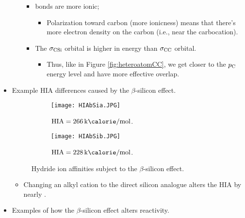 \documentclass[../notes.tex]{subfiles}
\begin{document}
\begin{itemize}
\begin{itemize}
\begin{itemize}
\begin{itemize}
            \end{itemize}
            \item {} bonds are more ionic;
            \begin{itemize}
                \item Polarization toward carbon (more ionicness) means that there's more electron density on the carbon (i.e., near the carbocation).
            \end{itemize}
            \item The $\sigma_{\ce{CSi}}$ orbital is higher in energy than $\sigma_{\ce{CC}}$ orbital.
            \begin{itemize}
                \item Thus, like in Figure \ref{fig:heteroatomCC}, we get closer to the $p_{\ce{C}}$ energy level and have more effective overlap.
            \end{itemize}
        \end{itemize}
    \end{itemize}
    \item Example HIA differences caused by the $\beta$-silicon effect.
    \begin{figure}[h!]
        \centering
        \begin{subfigure}[b]{0.25\linewidth}
            \centering
            \texttt{[image: HIAbSia.JPG]}
            \caption{$\text{HIA}=\kcal{266}$.}
            \label{fig:HIAbSia}
        \end{subfigure}
        \begin{subfigure}[b]{0.25\linewidth}
            \centering
            \texttt{[image: HIAbSib.JPG]}
            \caption{$\text{HIA}=\kcal{228}$.}
            \label{fig:HIAbSib}
        \end{subfigure}
        \caption{Hydride ion affinities subject to the $\beta$-silicon effect.}
        \label{fig:HIAbSi}
    \end{figure}
    \begin{itemize}
        \item Changing an alkyl cation to the direct silicon analogue alters the HIA by nearly .
    \end{itemize}
    \item Examples of how the $\beta$-silicon effect alters reactivity.
    \begin{figure}[h!]
        \centering
        \begin{subfigure}[b]{\linewidth}
            \centering

\end{subfigure}
\end{figure}
\end{itemize}
\end{document}
